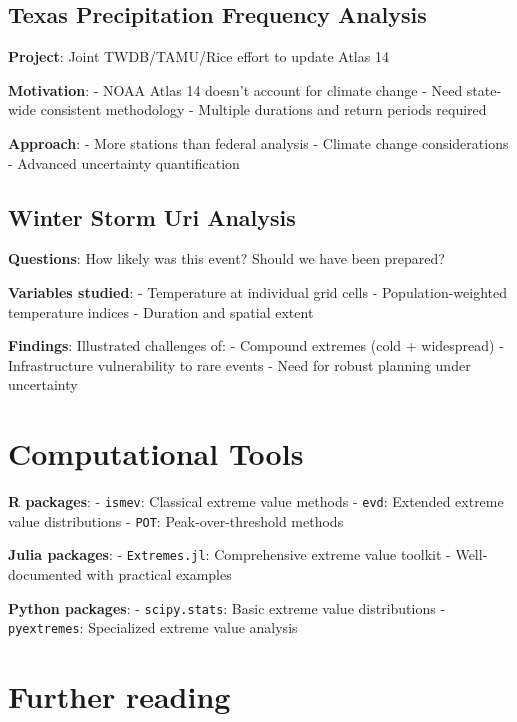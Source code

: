 \documentclass[
  letterpaper,
  DIV=11,
  numbers=noendperiod]{scrreprt}
\begin{document}
\subsection{Texas Precipitation Frequency
Analysis}\label{texas-precipitation-frequency-analysis}

\textbf{Project}: Joint TWDB/TAMU/Rice effort to update Atlas 14

\textbf{Motivation}: - NOAA Atlas 14 doesn't account for climate change
- Need state-wide consistent methodology - Multiple durations and return
periods required

\textbf{Approach}: - More stations than federal analysis - Climate
change considerations - Advanced uncertainty quantification

\subsection{Winter Storm Uri Analysis}\label{winter-storm-uri-analysis}

\textbf{Questions}: How likely was this event? Should we have been
prepared?

\textbf{Variables studied}: - Temperature at individual grid cells -
Population-weighted temperature indices - Duration and spatial extent

\textbf{Findings}: Illustrated challenges of: - Compound extremes (cold
+ widespread) - Infrastructure vulnerability to rare events - Need for
robust planning under uncertainty

\section{Computational Tools}\label{computational-tools}

\textbf{R packages}: - \texttt{ismev}: Classical extreme value methods -
\texttt{evd}: Extended extreme value distributions - \texttt{POT}:
Peak-over-threshold methods

\textbf{Julia packages}: - \texttt{Extremes.jl}: Comprehensive extreme
value toolkit - Well-documented with practical examples

\textbf{Python packages}: - \texttt{scipy.stats}: Basic extreme value
distributions - \texttt{pyextremes}: Specialized extreme value analysis

\section*{Further reading}\label{further-reading-7}
\end{document}
